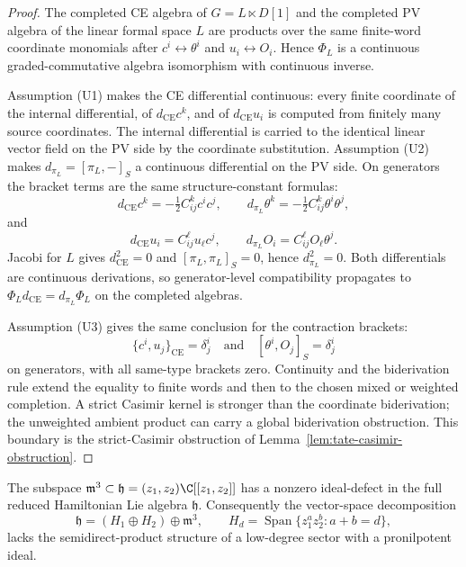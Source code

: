 \documentclass[11pt]{memoir}
\begin{document}
\begin{proof}
  The completed CE algebra of \(G=L\ltimes D[1]\) and the completed PV
  algebra of the linear formal space \(L\) are products over the same
  finite-word coordinate monomials after \(c^i\leftrightarrow\theta^i\)
  and \(u_i\leftrightarrow O_i\).  Hence \(\Phi_L\) is a continuous
  graded-commutative algebra isomorphism with continuous inverse.

  Assumption (U1) makes the CE differential continuous: every finite
  coordinate of the internal differential, of
  \(d_{\mathrm{CE}}c^k\), and of \(d_{\mathrm{CE}}u_i\) is computed
  from finitely many source coordinates.  The internal differential is
  carried to the identical linear vector field on the PV side by the
  coordinate substitution.  Assumption (U2) makes
  \(d_{\pi_L}=[\pi_L,-]_S\) a continuous differential on the PV side.
  On generators the bracket terms are the same structure-constant
  formulas:
  \[
    d_{\mathrm{CE}}c^k=-\tfrac12 C^k_{ij}c^ic^j,\qquad
    d_{\pi_L}\theta^k=-\tfrac12 C^k_{ij}\theta^i\theta^j,
  \]
  and
  \[
    d_{\mathrm{CE}}u_i=C^\ell_{ij}u_\ell c^j,\qquad
    d_{\pi_L}O_i=C^\ell_{ij}O_\ell\theta^j .
  \]
  Jacobi for \(L\) gives \(d_{\mathrm{CE}}^2=0\) and
  \([\pi_L,\pi_L]_S=0\), hence \(d_{\pi_L}^2=0\).  Both differentials
  are continuous derivations, so generator-level compatibility
  propagates to \(\Phi_Ld_{\mathrm{CE}}=d_{\pi_L}\Phi_L\) on the
  completed algebras.

  Assumption (U3) gives the same conclusion for the contraction
  brackets:
  \[
    \{c^i,u_j\}_{\mathrm{CE}}=\delta^i_j
    \quad\text{and}\quad
    [\theta^i,O_j]_S=\delta^i_j
  \]
  on generators, with all same-type brackets zero.  Continuity and the
  biderivation rule extend the equality to finite words and then to
  the chosen mixed or weighted completion.  A strict Casimir kernel is
  stronger than the coordinate biderivation; the unweighted ambient
  product can carry a global biderivation obstruction.  This boundary
  is the strict-Casimir obstruction of
  Lemma~\ref{lem:tate-casimir-obstruction}.
\end{proof}

\begin{prop}\label{prop:low-degree-pronilpotent-obstruction}
  The subspace \(\mathfrak m^3\subset\mathfrak h=(z_1,z_2)\C[[z_1,z_2]]\)
  has a nonzero ideal-defect in the full reduced Hamiltonian Lie algebra
  \(\mathfrak h\).  Consequently the vector-space decomposition
  \[
    \mathfrak h=(H_1\oplus H_2)\oplus\mathfrak m^3,
    \qquad
    H_d=\operatorname{Span}\{z_1^az_2^b:a+b=d\},
  \]
  lacks the semidirect-product structure of a low-degree sector with a
  pronilpotent ideal.
\end{prop}
\end{document}
